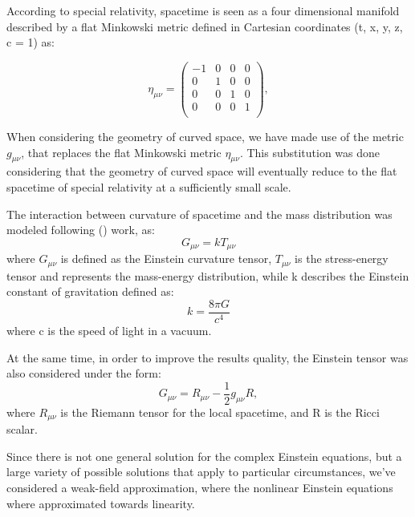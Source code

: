 \documentclass[twoside,11pt]{article}
\begin{document}
According to special relativity, spacetime is seen as a four dimensional manifold described by a flat Minkowski metric defined in Cartesian coordinates (t, x, y, z, c = 1) as:

\begin{equation} \label{Minkowski}
\eta_{\mu\nu}= 
\begin{pmatrix} 
-1 & 0 & 0 & 0 \\
0 & 1 & 0 & 0 \\
0 & 0 & 1 & 0 \\
0 & 0 & 0 & 1 \\
\end{pmatrix} ,
\end{equation}

When considering the geometry of curved space, we have made use of the metric $g_{\mu\nu}$, that replaces the flat Minkowski metric $\eta_{\mu\nu}$. This substitution was done considering that the geometry of curved space will eventually reduce to the flat spacetime of special relativity at a sufficiently small scale.

The interaction between curvature of spacetime and the mass distribution was modeled following (\cite{Blackburn}) work, as:
\begin{equation} \label{spacetime curvature}
G_{\mu\nu} = k T_{\mu\nu}
\end{equation} where $G_{\mu\nu}$ is defined as the Einstein curvature tensor, $T_{\mu\nu}$ is the stress-energy tensor and represents the mass-energy distribution, while k describes the Einstein constant of gravitation defined as:
\begin{equation} \label{Einstein_equation_1}
k = \frac{8\pi G}{c^4}
\end{equation} where c is the speed of light in a vacuum.

At the same time, in order to improve the results quality, the Einstein tensor was also considered under the form:
\begin{equation} \label{Einstein_equation_2}
G_{\mu\nu} = R_{\mu\nu}-\frac{1}{2}g_{\mu\nu}R,
\end{equation}
where $R_{\mu\nu}$ is the Riemann tensor for the local spacetime, and R is the Ricci scalar.

Since there is not one general solution for the complex Einstein equations, but a large variety of possible solutions that apply to particular circumstances, we've considered a weak-field approximation, where the nonlinear Einstein equations where approximated towards linearity. 
\end{document}
